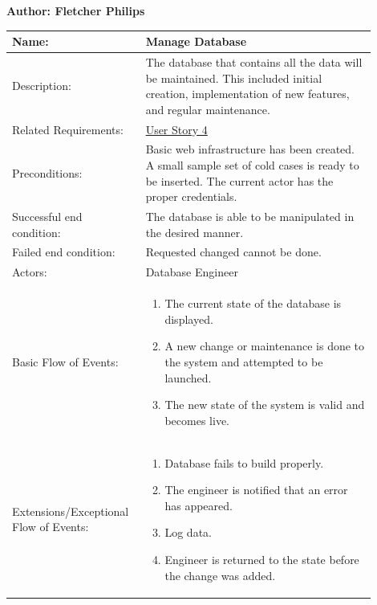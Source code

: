 \documentclass[11pt]{article}
\begin{document}
\begin{table}[!ht]
\begin{center}
\textbf{Author: Fletcher Philips}
\vspace*{1em}

\begin{tabular}{p{0.30\linewidth}p{0.60\linewidth}}
	Name: & Manage Database\\\hline
	Description: & The database that contains all the data will be maintained. This included initial creation, implementation of new features, and regular maintenance.\\\hline
	Related Requirements:& \hyperlink{us4}{User Story 4}\\\hline
	Preconditions:& Basic web infrastructure has been created. A small sample set of cold cases is ready to be inserted. The current actor has the proper credentials.\\\hline
	Successful end condition:& The database is able to be manipulated in the desired manner.\\\hline
	Failed end condition:& Requested changed cannot be done.\\\hline
	Actors:& Database Engineer\\\hline
	Basic Flow of Events: & \begin{enumerate}
	\item The current state of the database is displayed.
	\item A new change or maintenance is done to the system and attempted to be launched.
	\item The new state of the system is valid and becomes live.
	\end{enumerate}\\\hline
	Extensions/Exceptional Flow of Events: & \begin{enumerate}
	\item Database fails to build properly.
	\item The engineer is notified that an error has appeared.
	\item Log data.
	\item Engineer is returned to the state before the change was added.
	\end{enumerate}
\end{tabular}
\label{des:create_database}	
\end{center}
\end{table}
\end{document}
